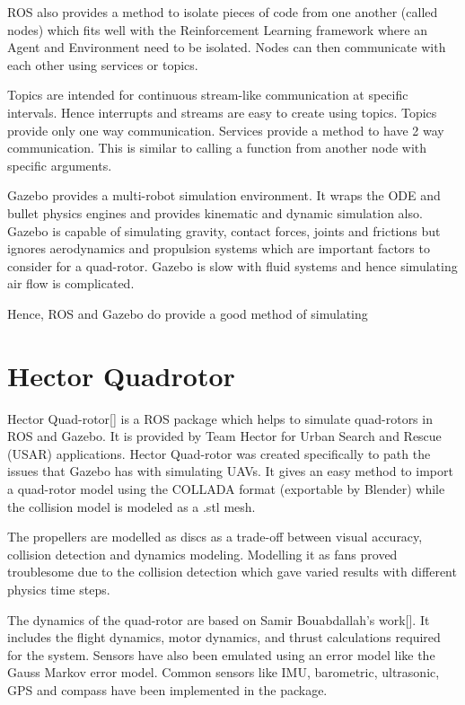 \documentclass[BTech]{iitmdiss}
\begin{document}
ROS also provides a method to isolate pieces of code from one another (called nodes) which fits well with the Reinforcement Learning framework where an Agent and Environment need to be isolated. Nodes can then communicate with each other using services or topics.

Topics are intended for continuous stream-like communication at specific intervals. Hence interrupts and streams are easy to create using topics. Topics provide only one way communication. Services provide a method to have 2 way communication. This is similar to calling a function from another node with specific arguments.

Gazebo provides a multi-robot simulation environment. It wraps the ODE and bullet physics engines and provides kinematic and dynamic simulation also. Gazebo is capable of simulating gravity, contact forces, joints and frictions but ignores aerodynamics and propulsion systems which are important factors to consider for a quad-rotor. Gazebo is slow with fluid systems and hence simulating air flow is complicated.

Hence, ROS and Gazebo do provide a good method of simulating

\section{Hector Quadrotor}

Hector Quad-rotor[\cite{HectorQuadrotor}] is a ROS package which helps to simulate quad-rotors in ROS and Gazebo. It is provided by Team Hector for Urban Search and Rescue (USAR) applications. Hector Quad-rotor was created specifically to path the issues that Gazebo has with simulating UAVs. It gives an easy method to import a quad-rotor model using the COLLADA format (exportable by Blender) while the collision model is modeled as a .stl mesh.

The propellers are modelled as discs as a trade-off between visual accuracy, collision detection and dynamics modeling. Modelling it as fans proved troublesome due to the collision detection which gave varied results with different physics time steps.

The dynamics of the quad-rotor are based on Samir Bouabdallah's work[]. It includes the flight dynamics, motor dynamics, and thrust calculations required for the system. Sensors have also been emulated using an error model like the Gauss Markov error model. Common sensors like IMU, barometric, ultrasonic, GPS and compass have been implemented in the package.
\end{document}
